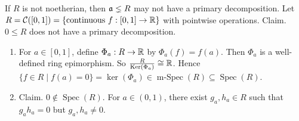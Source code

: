\begin{example}
    If $R$ is not noetherian, then $\mathfrak{a} \lneq R$ may not have a primary decomposition. Let $R = \mathcal{C}([0,1]) = \{\text{continuous }f: [0,1] \to \mathbb{R}\}$ with pointwise operations. Claim. $0 \leq R$ does not have a primary decomposition.
    \begin{enumerate}
        \item For $a \in [0,1]$, define $\Phi_a: R \to \mathbb{R}$ by $\Phi_a(f) = f(a)$. Then $\Phi_a$ is a well-defined ring epimorphism. So $\frac{R}{\operatorname{Ker}(\Phi_a)} \cong \mathbb{R}$. Hence $\{f \in R \mid f(a) = 0\} = \ker(\Phi_a) \in \operatorname{m-Spec}(R) \subseteq \operatorname{Spec}(R)$.
        \item Claim. $0 \not \in \operatorname{Spec}(R)$. For $a \in (0,1)$, there exist $g_a,h_a \in R$ such that $g_ah_a = 0$ but $g_a,h_a \neq 0$.
            

\end{enumerate}
\end{example}

